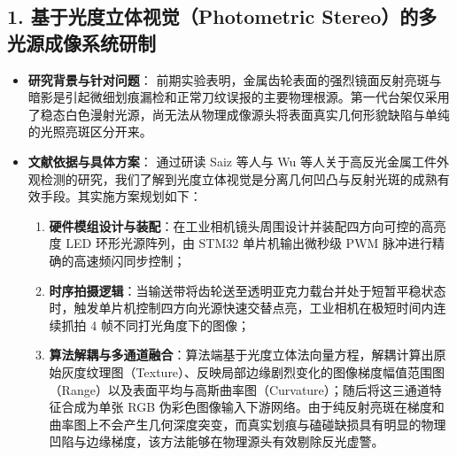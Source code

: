 \subsection*{1. 基于光度立体视觉（Photometric Stereo）的多光源成像系统研制}
\begin{itemize}
    \item \textbf{研究背景与针对问题}：
    前期实验表明，金属齿轮表面的强烈镜面反射亮斑与暗影是引起微细划痕漏检和正常刀纹误报的主要物理根源。第一代台架仅采用了稳态白色漫射光源，尚无法从物理成像源头将表面真实几何形貌缺陷与单纯的光照亮斑区分开来。
    \item \textbf{文献依据与具体方案}：
    通过研读 Saiz 等人与 Wu 等人关于高反光金属工件外观检测的研究，我们了解到光度立体视觉是分离几何凹凸与反射光斑的成熟有效手段。其实施方案规划如下：
    \begin{enumerate}
        \item \textbf{硬件模组设计与装配}：在工业相机镜头周围设计并装配四方向可控的高亮度 LED 环形光源阵列，由 STM32 单片机输出微秒级 PWM 脉冲进行精确的高速频闪同步控制；
        \item \textbf{时序拍摄逻辑}：当输送带将齿轮送至透明亚克力载台并处于短暂平稳状态时，触发单片机控制四方向光源快速交替点亮，工业相机在极短时间内连续抓拍 4 帧不同打光角度下的图像；
        \item \textbf{算法解耦与多通道融合}：算法端基于光度立体法向量方程，解耦计算出原始灰度纹理图（Texture）、反映局部边缘剧烈变化的图像梯度幅值范围图（Range）以及表面平均与高斯曲率图（Curvature）；随后将这三通道特征合成为单张 RGB 伪彩色图像输入下游网络。由于纯反射亮斑在梯度和曲率图上不会产生几何深度突变，而真实划痕与磕碰缺损具有明显的物理凹陷与边缘梯度，该方法能够在物理源头有效剔除反光虚警。
    \end{enumerate}
\end{itemize}

